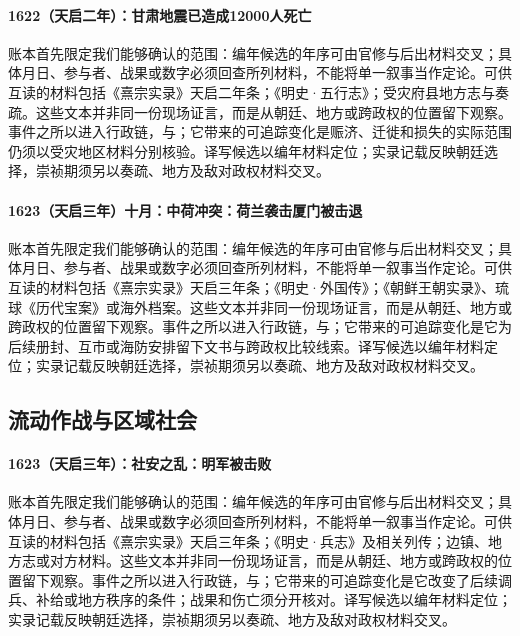 \paragraph{1622（天启二年）：甘肃地震已造成12000人死亡} 账本首先限定我们能够确认的范围：编年候选的年序可由官修与后出材料交叉；具体月日、参与者、战果或数字必须回查所列材料，不能将单一叙事当作定论。可供互读的材料包括《熹宗实录》天启二年条；《明史·五行志》；受灾府县地方志与奏疏。这些文本并非同一份现场证言，而是从朝廷、地方或跨政权的位置留下观察。事件之所以进入行政链，与；它带来的可追踪变化是赈济、迁徙和损失的实际范围仍须以受灾地区材料分别核验。译写候选以编年材料定位；实录记载反映朝廷选择，崇祯期须另以奏疏、地方及敌对政权材料交叉。

\paragraph{1623（天启三年）十月：中荷冲突：荷兰袭击厦门被击退} 账本首先限定我们能够确认的范围：编年候选的年序可由官修与后出材料交叉；具体月日、参与者、战果或数字必须回查所列材料，不能将单一叙事当作定论。可供互读的材料包括《熹宗实录》天启三年条；《明史·外国传》；《朝鲜王朝实录》、琉球《历代宝案》或海外档案。这些文本并非同一份现场证言，而是从朝廷、地方或跨政权的位置留下观察。事件之所以进入行政链，与；它带来的可追踪变化是它为后续册封、互市或海防安排留下文书与跨政权比较线索。译写候选以编年材料定位；实录记载反映朝廷选择，崇祯期须另以奏疏、地方及敌对政权材料交叉。

\subsection{流动作战与区域社会}

\paragraph{1623（天启三年）：社安之乱：明军被击败} 账本首先限定我们能够确认的范围：编年候选的年序可由官修与后出材料交叉；具体月日、参与者、战果或数字必须回查所列材料，不能将单一叙事当作定论。可供互读的材料包括《熹宗实录》天启三年条；《明史·兵志》及相关列传；边镇、地方志或对方材料。这些文本并非同一份现场证言，而是从朝廷、地方或跨政权的位置留下观察。事件之所以进入行政链，与；它带来的可追踪变化是它改变了后续调兵、补给或地方秩序的条件；战果和伤亡须分开核对。译写候选以编年材料定位；实录记载反映朝廷选择，崇祯期须另以奏疏、地方及敌对政权材料交叉。

